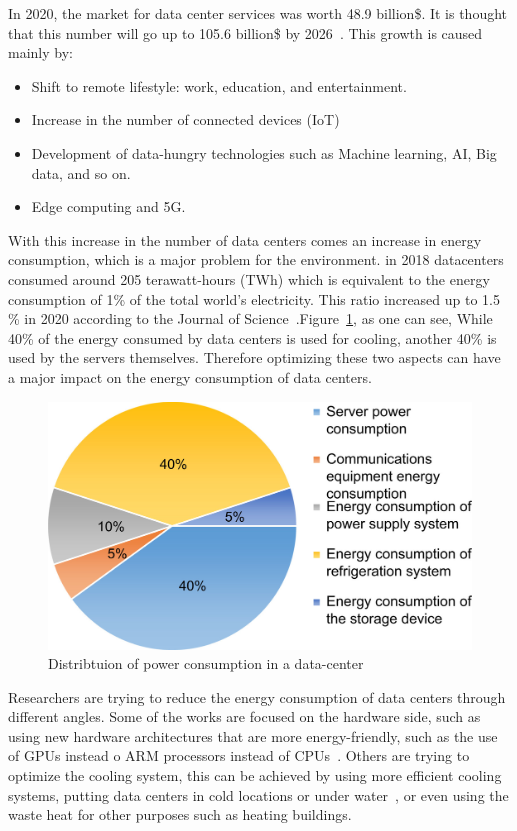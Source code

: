 In 2020, the market for data center services was worth 48.9 billion\$. It is thought that this number will go up to 105.6 billion\$ by 2026~\cite{inshakova2022data}. This growth is caused mainly by:
\begin{itemize}
    \item Shift to remote lifestyle: work, education, and entertainment.
    \item Increase in the number of connected devices (IoT)
    \item Development of data-hungry technologies such as Machine learning, AI, Big data, and so on.
    \item Edge computing and 5G.
\end{itemize} 

With this increase in the number of data centers comes an increase in energy consumption, which is a major problem for the environment. 
in 2018 datacenters consumed around 205 terawatt-hours (TWh)\cite{schneider2021world} which is equivalent to the energy consumption of 1\% of the total world's electricity. This ratio increased up to 1.5 \% in 2020 according to the Journal of Science~\cite{mytton2021data}.Figure~\ref{fig:data_centers_power_distribution}, as one can see, While 40\% of the energy consumed by data centers is used for cooling, another 40\% is used by the servers themselves. Therefore optimizing these two aspects can have a major impact on the energy consumption of data centers.
\begin{figure}[!h]
    \centering
    \includegraphics[width=0.6\linewidth]{chapters/data_centers_power_distribution}
    \caption{Distribtuion of power consumption in a data-center\cite{rong2016optimizing}}
    \label{fig:data_centers_power_distribution}
\end{figure}

Researchers are trying to reduce the energy consumption of data centers through different angles. Some of the works are focused on the hardware side, such as using new hardware architectures that are more energy-friendly, such as the use of GPUs instead o ARM processors instead of CPUs~\cite{aroca2012towards}. Others are trying to optimize the cooling system, this can be achieved by using more efficient cooling systems, putting data centers in cold locations or under water~\cite{simon2018project}, or even using the waste heat for other purposes such as heating buildings\cite{bouzel2021distributed,cao2021carbon}. 

